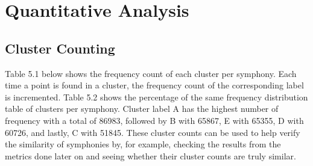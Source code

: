 \section{Quantitative Analysis}

\subsection{Cluster Counting}
Table 5.1 below shows the frequency count of each cluster per symphony. Each time a point is found in a cluster, the frequency count of the corresponding label is incremented. Table 5.2 shows the percentage of the same frequency distribution table of clusters per symphony. Cluster label A has the highest number of frequency with a total of 86983, followed by B with 65867, E with 65355, D with 60726, and lastly, C with 51845. These cluster counts can be used to help verify the similarity of symphonies by, for example, checking the results from the metrics done later on and seeing whether their cluster counts are truly similar.

